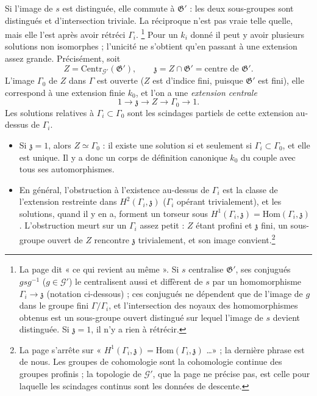 \documentclass[11pt,a4paper]{article}
\begin{document}
Si l'image de $s$ est distinguée, elle commute à $\mathfrak{G}'$ : les deux
sous-groupes sont distingués et d'intersection triviale. La réciproque n'est
pas vraie telle quelle, mais elle l'est après avoir rétréci $\Gamma_{i}$.%
\footnote{La page dit « ce qui revient au même ». Si $s$ centralise
$\mathfrak{G}'$, ses conjugués $g s g^{-1}$ ($g \in \mathcal{G}'$) le
centralisent aussi et diffèrent de $s$ par un homomorphisme $\Gamma_{i} \to
\mathfrak{z}$ (notation ci-dessous) ; ces conjugués ne dépendent que de
l'image de $g$ dans le groupe fini $\Gamma/\Gamma_{i}$, et l'intersection des
noyaux des homomorphismes obtenus est un sous-groupe ouvert distingué sur
lequel l'image de $s$ devient distinguée. Si $\mathfrak{z} = 1$, il n'y a rien
à rétrécir.} Pour un $k_{i}$ donné il peut y avoir plusieurs solutions non
isomorphes ; l'unicité ne s'obtient qu'en passant à une extension assez
grande. Précisément, soit
\[
Z = \mathrm{Centr}_{\mathcal{G}'}(\mathfrak{G}'),
\qquad
\mathfrak{z} = Z \cap \mathfrak{G}' = \text{centre de } \mathfrak{G}' .
\]
L'image $\Gamma_{0}$ de $Z$ dans $\Gamma$ est ouverte ($Z$ est d'indice fini,
puisque $\mathfrak{G}'$ est fini), elle correspond à une extension finie
$k_{0}$, et l'on a une \emph{extension centrale}
\[
1 \to \mathfrak{z} \to Z \to \Gamma_{0} \to 1 .
\]
Les solutions relatives à $\Gamma_{i} \subset \Gamma_{0}$ sont les scindages
partiels de cette extension au-dessus de $\Gamma_{i}$.

\begin{itemize}
\item Si $\mathfrak{z} = 1$, alors $Z \simeq \Gamma_{0}$ : il existe une
solution si et seulement si $\Gamma_{i} \subset \Gamma_{0}$, et elle est
unique. Il y a donc un corps de définition canonique $k_{0}$ du couple avec
tous ses automorphismes.
\item En général, l'obstruction à l'existence au-dessus de $\Gamma_{i}$ est la
classe de l'extension restreinte dans $H^{2}(\Gamma_{i}, \mathfrak{z})$
($\Gamma_{i}$ opérant trivialement), et les solutions, quand il y en a,
forment un torseur sous $H^{1}(\Gamma_{i}, \mathfrak{z}) =
\mathrm{Hom}(\Gamma_{i}, \mathfrak{z})$. L'obstruction meurt sur un
$\Gamma_{i}$ assez petit : $Z$ étant profini et $\mathfrak{z}$ fini, un
sous-groupe ouvert de $Z$ rencontre $\mathfrak{z}$ trivialement, et son image
convient.\footnote{La page s'arrête sur « $H^{1}(\Gamma_{i}, \mathfrak{z}) =
\mathrm{Hom}(\Gamma_{i}, \mathfrak{z})$ \ldots » ; la dernière phrase est de
nous. Les groupes de cohomologie sont la cohomologie continue des groupes
profinis ; la topologie de $\mathcal{G}'$, que la page ne précise pas, est
celle pour laquelle les scindages continus sont les données de descente.}
\end{itemize}
\end{document}

